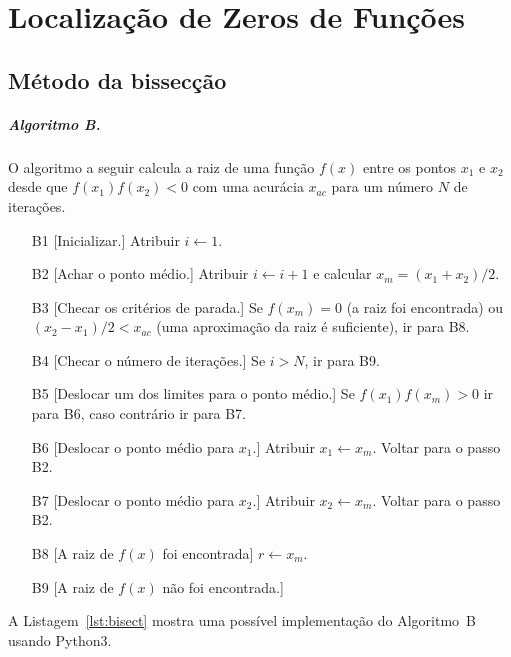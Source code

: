\chapter{Localização de Zeros de Funções}


\section{Método da bissecção}

\paragraph{Algoritmo B.} O algoritmo a seguir calcula 
a raiz de uma função $f(x)$ entre os pontos $x_1$ e $x_2$ 
desde que $f(x_1)f(x_2)<0$ com uma acurácia $x_{ac}$
para um número $N$ de iterações.

\begin{enumerate}[1]
	\item[B1] [Inicializar.] Atribuir $i \leftarrow 1$.
	\item[B2] [Achar o ponto médio.] Atribuir $i\leftarrow i+1$ e
		   calcular $x_m = (x_1+x_2)/2$.
	\item[B3] [Checar os critérios de parada.] Se $f(x_m)=0$ 
		(a raiz foi encontrada)
		ou \hbox{$(x_2-x_1)/2 < x_{ac}$} (uma aproximação da 
		raiz é suficiente), ir para B8.
	\item[B4] [Checar o número de iterações.] Se $i > N$, 
		ir para B9.
	\item[B5] [Deslocar um dos limites para o ponto médio.] 
		Se $f(x_1)f(x_m)>0$ ir para B6, caso contrário 
		ir para B7.
	\item[B6] [Deslocar o ponto médio para $x_1$.] Atribuir
		$x_1\leftarrow x_m$. Voltar para o passo B2.
	\item[B7] [Deslocar o ponto médio para $x_2$.] Atribuir
		$x_2\leftarrow x_m$. Voltar para o passo B2.
	\item[B8] [A raiz de $f(x)$ foi encontrada] $r \leftarrow x_m$.
	\item[B9] [A raiz de $f(x)$ não foi encontrada.]
\end{enumerate}

A Listagem~\ref{lst:bisect} mostra uma possível implementação 
do Algoritmo~B usando Python3.


